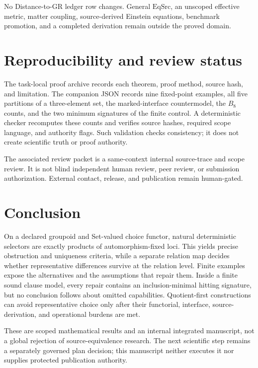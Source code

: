 \documentclass[11pt]{article}
\theoremstyle{definition}
\begin{document}
No Distance-to-GR ledger row changes.  General \(\mathrm{EqSrc}\), an
unscoped effective metric, matter coupling, source-derived Einstein
equations, benchmark promotion, and a completed derivation remain outside the
proved domain.

\section{Reproducibility and review status}

The task-local proof archive records each theorem, proof method, source hash,
and limitation.  The companion JSON records nine fixed-point examples, all
five partitions of a three-element set, the marked-interface countermodel,
the \(B_8\) counts, and the two minimum signatures of the finite control.
A deterministic checker recomputes these counts and verifies source hashes,
required scope language, and authority flags.  Such validation checks
consistency; it does not create scientific truth or proof authority.

The associated review packet is a same-context internal source-trace and
scope review.  It is not blind independent human review, peer review, or
submission authorization.  External contact, release, and publication remain
human-gated.

\section{Conclusion}

On a declared groupoid and Set-valued choice functor, natural deterministic
selectors are exactly products of automorphism-fixed loci.  This yields
precise obstruction and uniqueness criteria, while a separate relation map
decides whether representative differences survive at the relation level.
Finite examples expose the alternatives and the assumptions that repair them.
Inside a finite sound clause model, every repair contains an
inclusion-minimal hitting signature, but no conclusion follows about omitted
capabilities.  Quotient-first constructions can avoid representative choice
only after their functorial, interface, source-derivation, and operational
burdens are met.

These are scoped mathematical results and an internal integrated manuscript,
not a global rejection of source-equivalence research.  The next scientific
step remains a separately governed plan decision; this manuscript neither
executes it nor supplies protected publication authority.
\end{document}
